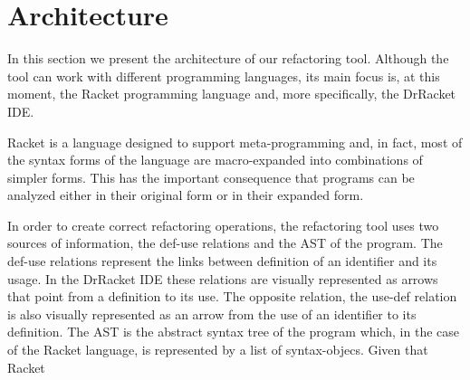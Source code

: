 \section{Architecture}


In this section we present the architecture of our refactoring tool.
Although the tool can work with different programming languages, its
main focus is, at this moment, the Racket programming language and,
more specifically, the DrRacket IDE.

Racket is a language designed to support meta-programming and, in
fact, most of the syntax forms of the language are macro-expanded into
combinations of simpler forms.  This has the important consequence
that programs can be analyzed either in their original form or in
their expanded form.

In order to create correct refactoring operations, the refactoring
tool uses two sources of information, the def-use relations and the
AST of the program.  The def-use relations represent the links between
definition of an identifier and its usage.  In the DrRacket IDE these
relations are visually represented as arrows that point from a
definition to its use.  The opposite relation, the use-def relation is
also visually represented as an arrow from the use of an identifier to
its definition.  The AST is the abstract syntax tree of the program
which, in the case of the Racket language, is represented by a list of
syntax-objecs.  Given that Racket



